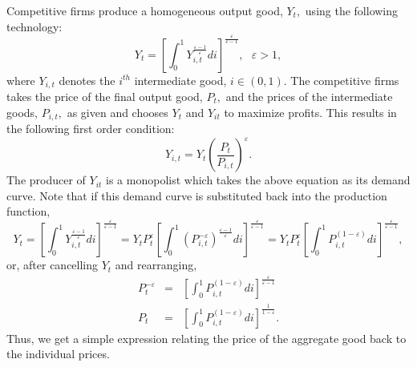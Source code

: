 \documentclass[12pt,thmsa]{article}
\begin{document}
Competitive firms produce a homogeneous output good, $Y_{t},$ using the
following technology:%
\begin{equation*}
Y_{t}=\left[ \int_{0}^{1}Y_{i,t}^{\frac{\varepsilon -1}{\varepsilon }}di%
\right] ^{\frac{\varepsilon }{\varepsilon -1}},\text{ }\varepsilon >1,
\end{equation*}%
where $Y_{i,t}$ denotes the $i^{th}$ intermediate good, $i\in \left(
0,1\right) .$ The competitive firms takes the price of the final output
good, $P_{t},$ and the prices of the intermediate goods, $P_{i,t},$ as given
and chooses $Y_{t}$ and $Y_{it}$ to maximize profits. This results in the
following first order condition:%
\begin{equation*}
Y_{i,t}=Y_{t}\left( \frac{P_{t}}{P_{i,t}}\right) ^{\varepsilon }.
\end{equation*}%
The producer of $Y_{it}$ is a monopolist which takes the above equation as
its demand curve. Note that if this demand curve is substituted back into
the production function, 
\begin{equation*}
Y_{t}=\left[ \int_{0}^{1}Y_{i,t}^{\frac{\varepsilon -1}{\varepsilon }}di%
\right] ^{\frac{\varepsilon }{\varepsilon -1}}=Y_{t}P_{t}^{\varepsilon }%
\left[ \int_{0}^{1}\left( P_{i,t}^{-\varepsilon }\right) ^{\frac{\varepsilon
-1}{\varepsilon }}di\right] ^{\frac{\varepsilon }{\varepsilon -1}%
}=Y_{t}P_{t}^{\varepsilon }\left[ \int_{0}^{1}P_{i,t}^{\left( 1-\varepsilon
\right) }di\right] ^{\frac{\varepsilon }{\varepsilon -1}},
\end{equation*}%
or, after cancelling $Y_{t}$ and rearranging,%
\begin{eqnarray*}
P_{t}^{-\varepsilon } &=&\left[ \int_{0}^{1}P_{i,t}^{\left( 1-\varepsilon
\right) }di\right] ^{\frac{\varepsilon }{\varepsilon -1}} \\
P_{t} &=&\left[ \int_{0}^{1}P_{i,t}^{\left( 1-\varepsilon \right) }di\right]
^{\frac{1}{1-\varepsilon }}.
\end{eqnarray*}%
Thus, we get a simple expression relating the price of the aggregate good
back to the individual prices.
\end{document}
